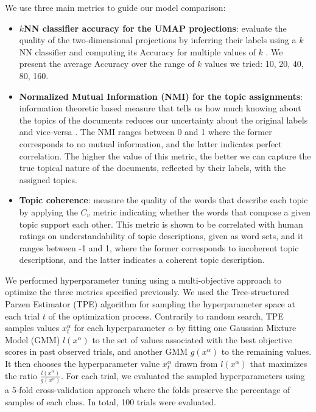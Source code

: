\documentclass[a4paper]{article}
\begin{document}
We use three main metrics to guide our model comparison:
\begin{itemize}
	\item \textbf{$k$NN classifier accuracy for the UMAP projections}: evaluate the quality of the two-dimensional projections by inferring their labels using a $k$NN classifier and computing its Accuracy for multiple values of $k$ \citep{mcinnes2020}. We present the average Accuracy over the range of $k$ values we tried: 10, 20, 40, 80, 160.
	\item \textbf{Normalized Mutual Information (NMI) for the topic assignments}: information theoretic based measure that tells us how much knowing about the topics of the documents reduces our uncertainty about the original labels and vice-versa \citep{vinh2009}. The NMI ranges between 0 and 1 where the former corresponds to no mutual information, and the latter indicates perfect correlation. The higher the value of this metric, the better we can capture the true topical nature of the documents, reflected by their labels, with the assigned topics.
	\item \textbf{Topic coherence}: measure the quality of the words that describe each topic by applying the $C_v$ metric \citep{roder2015} indicating whether the words that compose a given topic support each other. This metric is shown to be correlated with human ratings on understandability of topic descriptions, given as word sets, and it ranges between -1 and 1, where the former corresponds to incoherent topic descriptions, and the latter indicates a coherent topic description.
\end{itemize}

We performed hyperparameter tuning using a multi-objective approach to optimize the three metrics specified previously. We used the Tree-structured Parzen Estimator (TPE) algorithm \citep{bergstra2011, ozaki2020} for sampling the hyperparameter space at each trial $t$ of the optimization process. Contrarily to random search, TPE samples values $x_t^\alpha$ for each hyperparameter $\alpha$ by fitting one Gaussian Mixture Model (GMM) $l(x^\alpha)$ to the set of values associated with the best objective scores in past observed trials, and another GMM $g(x^\alpha)$ to the remaining values. It then chooses the hyperparameter value $x_t^\alpha$ drawn from $l(x^\alpha)$ that maximizes the ratio $\frac{l(x^\alpha)}{g(x^\alpha)}$. For each trial, we evaluated the sampled hyperparameters using a 5-fold cross-validation approach where the folds preserve the percentage of samples of each class. In total, 100 trials were evaluated.
\end{document}
